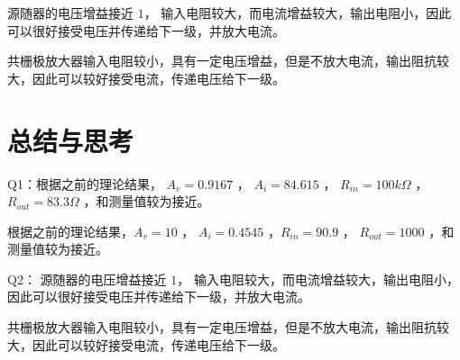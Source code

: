 \documentclass[lang=cn,11pt,a4paper,cite=authoryear]{elegantpaper}
\begin{document}
源随器的电压增益接近 \(1\)， 输入电阻较大，而电流增益较大，输出电阻小，因此可以很好接受电压并传递给下一级，并放大电流。

共栅极放大器输入电阻较小，具有一定电压增益，但是不放大电流，输出阻抗较大，因此可以较好接受电流，传递电压给下一级。

\section{总结与思考}

Q1：根据之前的理论结果， \(A_v = 0.9167\) ， \(A_i = 84.615\) ， \(R_{in} = 100 k \Omega\) ， \(R_{out} = 83.3 \Omega\) ，和测量值较为接近。

根据之前的理论结果，\(A_v = 10\) ， \(A_i = 0.4545\) ，\(R_{in} = 90.9\) ， \(R_{out} = 1000\) ，和测量值较为接近。

Q2：
源随器的电压增益接近 \(1\)， 输入电阻较大，而电流增益较大，输出电阻小，因此可以很好接受电压并传递给下一级，并放大电流。

共栅极放大器输入电阻较小，具有一定电压增益，但是不放大电流，输出阻抗较大，因此可以较好接受电流，传递电压给下一级。


\end{document}
